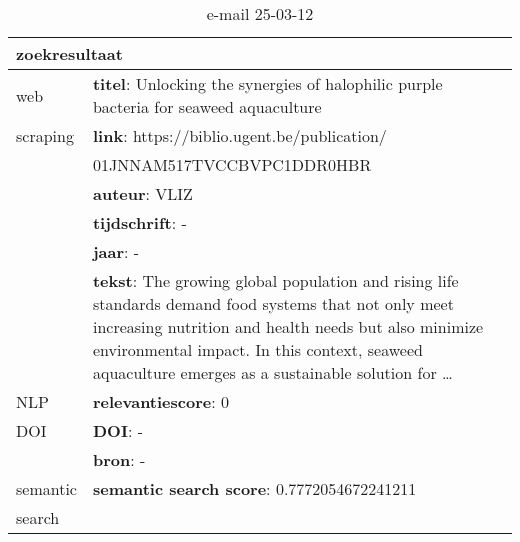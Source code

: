 \begin{table}[h!]
    \caption{e-mail 25-03-12}
    \centering
    \begin{tabularx}{\textwidth}{|p{4cm}|X|} 
        \hline
        \multicolumn{2}{|X|}{\textbf{zoekresultaat}} \\
        \hline
        web &\textbf{titel}: Unlocking the synergies of halophilic purple bacteria for seaweed aquaculture\\
        scraping&\textbf{link}: https://biblio.ugent.be/publication/\\&01JNNAM517TVCCBVPC1DDR0HBR\\
        &\textbf{auteur}: VLIZ\\
        &\textbf{tijdschrift}: -\\
        &\textbf{jaar}: -\\
        &\textbf{tekst}: The growing global population and rising life standards demand food systems that not only meet increasing nutrition and health needs but also minimize environmental impact. In this context, seaweed aquaculture emerges as a sustainable solution for …\\
        \hline
        NLP&\textbf{relevantiescore}: 0\\
        \hline
        DOI&\textbf{DOI}: -\\
        &\textbf{bron}: -\\
        \hline
        semantic&\textbf{semantic search score}: 0.7772054672241211\\
        search&\\
        \hline
    \end{tabularx}
    \label{table:email20250312}
\end{table}
